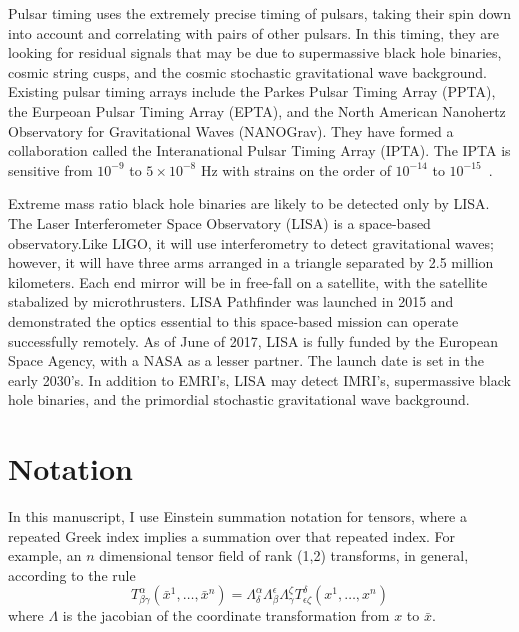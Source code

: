 Pulsar timing uses the extremely precise timing of pulsars, taking their spin down into account and correlating with pairs of other pulsars. In this timing, they are looking for residual signals that may be due to supermassive black hole binaries, cosmic string cusps, and the cosmic stochastic gravitational wave background. Existing pulsar timing arrays include the Parkes Pulsar Timing Array (PPTA), the Eurpeoan Pulsar Timing Array (EPTA), and the North American Nanohertz Observatory for Gravitational Waves (NANOGrav). They have formed a collaboration called the Interanational Pulsar Timing Array (IPTA). The IPTA is sensitive from $10^{-9}$ to $5\times10^{-8}$ Hz with strains on the order of $10^{-14}$ to $10^{-15}$~\cite{hobbs_dai}.



Extreme mass ratio black hole binaries are likely to be detected only by LISA. The Laser Interferometer Space Observatory (LISA) is a space-based observatory.Like LIGO, it will use interferometry to detect gravitational waves; however, it will have three arms arranged in a triangle separated by 2.5 million kilometers. Each end mirror will be in free-fall on a satellite, with the satellite stabalized by microthrusters. LISA Pathfinder was launched in 2015 and demonstrated the optics essential to this space-based mission can operate successfully remotely. As of June of 2017, LISA is fully funded by the European Space Agency, with a NASA as a lesser partner. The launch date is set in the early 2030's. In addition to EMRI's, LISA may detect IMRI's, supermassive black hole binaries, and the primordial stochastic gravitational wave background.


\section{Notation}
In this manuscript, I use Einstein summation notation for tensors, where a repeated Greek index implies a summation over that repeated index. For example, an $n$ dimensional tensor field of rank (1,2) transforms, in general, according to the rule
\begin{equation}
  T^\alpha_{\beta\gamma}(\bar{x}^1,\ldots,\bar{x}^n)=\Lambda^\alpha_\delta\Lambda^\epsilon_\beta\Lambda^\zeta_\gamma T^\delta_{\epsilon\zeta}(x^1,\ldots,x^n)
\end{equation}
where $\Lambda$ is the jacobian of the coordinate transformation from $x$ to $\bar{x}$. 

